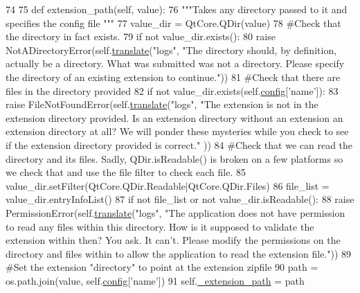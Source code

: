 \begin{DoxyCode}
74 
75     \textcolor{keyword}{def }extension\_path(self, value):
76         \textcolor{stringliteral}{"""Takes any directory passed to it and specifies the config file  """}
77         value\_dir = QtCore.QDir(value)
78         \textcolor{comment}{#Check that the directory in fact exists.}
79         \textcolor{keywordflow}{if} \textcolor{keywordflow}{not} value\_dir.exists():
80             \textcolor{keywordflow}{raise} NotADirectoryError(self.\hyperlink{classcommotion__client_1_1utils_1_1validate_1_1ClientConfig_a12d19377a853ce92cc0e0d758acdd804}{translate}(\textcolor{stringliteral}{"logs"}, \textcolor{stringliteral}{"The directory should, by definition,
       actually be a directory. What was submitted was not a directory. Please specify the directory of an existing
       extension to continue."}))
81         \textcolor{comment}{#Check that there are files in the directory provided}
82         \textcolor{keywordflow}{if} \textcolor{keywordflow}{not} value\_dir.exists(self.\hyperlink{classcommotion__client_1_1utils_1_1validate_1_1ClientConfig_acce323dd2fef1e3c2819cd0ed068cb67}{config}[\textcolor{stringliteral}{'name'}]):
83             \textcolor{keywordflow}{raise} FileNotFoundError(self.\hyperlink{classcommotion__client_1_1utils_1_1validate_1_1ClientConfig_a12d19377a853ce92cc0e0d758acdd804}{translate}(\textcolor{stringliteral}{"logs"}, \textcolor{stringliteral}{"The extension is not in the extension
       directory provided. Is an extension directory without an extension an extension directory at all? We will
       ponder these mysteries while you check to see if the extension directory provided is correct."} ))
84         \textcolor{comment}{#Check that we can read the directory and its files. Sadly, QDir.isReadable() is broken on a few
       platforms so we check that and use the file filter to check each file.}
85         value\_dir.setFilter(QtCore.QDir.Readable|QtCore.QDir.Files)
86         file\_list = value\_dir.entryInfoList()
87         \textcolor{keywordflow}{if} \textcolor{keywordflow}{not} file\_list \textcolor{keywordflow}{or} \textcolor{keywordflow}{not} value\_dir.isReadable():
88             \textcolor{keywordflow}{raise} PermissionError(self.\hyperlink{classcommotion__client_1_1utils_1_1validate_1_1ClientConfig_a12d19377a853ce92cc0e0d758acdd804}{translate}(\textcolor{stringliteral}{"logs"}, \textcolor{stringliteral}{"The application does not have permission
       to read any files within this directory. How is it supposed to validate the extension within then? You ask.
       It can't. Please modify the permissions on the directory and files within to allow the application to read
       the extension file."}))
89         \textcolor{comment}{#Set the extension "directory" to point at the extension zipfile}
90         path = os.path.join(value, self.\hyperlink{classcommotion__client_1_1utils_1_1validate_1_1ClientConfig_acce323dd2fef1e3c2819cd0ed068cb67}{config}[\textcolor{stringliteral}{'name'}])
91         self.\hyperlink{classcommotion__client_1_1utils_1_1validate_1_1ClientConfig_a42238419ef470bda7d663cea34c74213}{\_extension\_path} = path

\end{DoxyCode}
